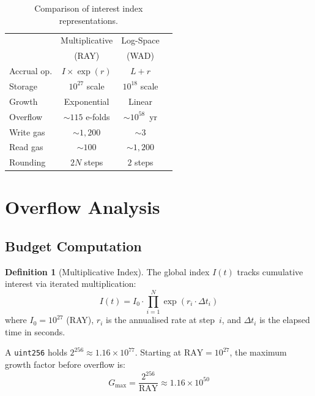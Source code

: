 \documentclass[10pt,a4paper,twocolumn]{article}
\theoremstyle{definition}
\newtheorem{definition}{Definition}[section]
\theoremstyle{plain}
\theoremstyle{remark}
\begin{document}
\begin{table}[htbp]
\centering
\caption{Comparison of interest index representations.}
\label{tab:comparison}
\small
\begin{tabular*}{0.95\columnwidth}{@{\extracolsep{\fill}}lccc@{}}
\toprule
& Multiplicative & Log-Space \\
& (RAY) & (WAD) \\
\midrule
Accrual op. & $I \times \exp(r)$ & $L + r$ \\
Storage & $10^{27}$ scale & $10^{18}$ scale \\
Growth & Exponential & Linear \\
Overflow & ${\sim}115$ e-folds & ${\sim}10^{58}$~yr \\
Write gas & ${\sim}1{,}200$ & ${\sim}3$ \\
Read gas & ${\sim}100$ & ${\sim}1{,}200$ \\
Rounding & $2N$ steps & $2$ steps \\
\bottomrule
\end{tabular*}
\end{table}

\section{Overflow Analysis}
\label{sec:overflow}

\subsection{Budget Computation}
\label{subsec:budget}

\begin{definition}[Multiplicative Index]
\label{def:mult-index}
The global index $I(t)$ tracks cumulative interest via iterated multiplication:
\begin{equation}
\label{eq:mult-index}
I(t) = I_0 \cdot \prod_{i=1}^{N} \exp(r_i \cdot \Delta t_i)
\end{equation}
where $I_0 = 10^{27}$ (RAY), $r_i$ is the annualised rate at step~$i$, and $\Delta t_i$ is the elapsed time in seconds.
\end{definition}

A \texttt{uint256} holds $2^{256} \approx 1.16 \times 10^{77}$. Starting at $\text{RAY} = 10^{27}$, the maximum growth factor before overflow is:
\begin{equation}
\label{eq:max-growth}
G_{\max} = \frac{2^{256}}{\text{RAY}} \approx 1.16 \times 10^{50}
\end{equation}
\end{document}
